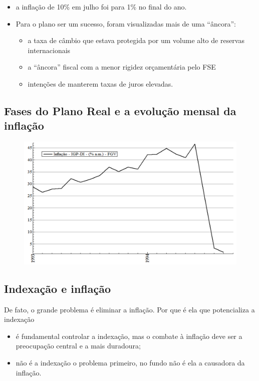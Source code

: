 \documentclass[a4paper,12pt]{article}[abntex2]
\begin{document}
\begin{enumerate}
\begin{itemize}
         \item a inflação de 10\% em julho foi para 1\% no final do ano.
         \item Para o plano ser um sucesso, foram visualizadas mais de uma “âncora”:\begin{itemize}
             \item a taxa de câmbio que estava protegida por um volume alto de reservas internacionais
             \item a “âncora” fiscal com a menor rigidez orçamentária pelo FSE
             \item intenções de manterem taxas de juros elevadas.
         \end{itemize}
     \end{itemize}
\end{enumerate}

\subsection{\textbf{Fases do Plano Real e a evolução mensal da inflação}}
\begin{figure}[H]
    \centering
    \includegraphics[width=0.7\linewidth]{Imagens/a13i1.png}
\end{figure}

\subsection{\textbf{Indexação e inflação}}
De fato, o grande problema é eliminar a inflação. Por que é ela que potencializa a indexação \begin{itemize}
    \item é fundamental controlar a indexação, mas o combate à inflação deve ser a preocupação central e a mais duradoura; 
    \item não é a indexação o problema primeiro, no fundo não é ela a causadora da inflação. 
\end{itemize}
\end{document}
